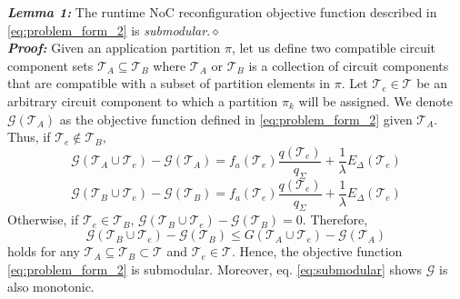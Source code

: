 {{\noindent\textbf{\textit{Lemma 1:}} The runtime NoC reconfiguration objective function described in \eqref{eq:problem_form_2} is \textit{submodular}.\hfill $\diamond$\\
\textbf{\textit{Proof:}} Given an application partition $\pi$, let us define two compatible circuit component sets $\mathcal T_A \subseteq \mathcal T_B$ where $\mathcal T_A$ or $\mathcal T_B$ is a collection of circuit components that are compatible with a subset of partition elements in $\pi$. Let $\mathcal T_{e} \in \mathcal T$ be an arbitrary circuit component to which a partition $\pi_{k}$ will be assigned. We denote $\mathcal G(\mathcal T_A)$ as the objective function defined in \eqref{eq:problem_form_2} given $\mathcal T_A$. Thus, if $\mathcal T_{e} \notin \mathcal T_{B}$,
\begin{equation}\label{eq:submodular}
\mathcal G(\mathcal T_A \cup \mathcal T_e)-\mathcal G(\mathcal T_A )= f_{a}(\mathcal T_{e})\frac{q(\mathcal T_{e})}{q_{\Sigma}}+ \frac{1}{\lambda} E_{\Delta}(\mathcal T_{e}) 
\end{equation}
\begin{equation}\label{eq:submodular_2}
\mathcal G(\mathcal T_B \cup \mathcal T_e)-\mathcal G(\mathcal T_B )= f_{a}(\mathcal T_{e})\frac{q(\mathcal T_{e})}{q_{\Sigma}}+ \frac{1}{\lambda} E_{\Delta}(\mathcal T_{e}) 
\end{equation}
Otherwise, if $\mathcal T_{e} \in \mathcal T_{B}$, $\mathcal G(\mathcal T_B \cup \mathcal T_e)-\mathcal G(\mathcal T_B )=0$. Therefore, 
\begin{equation}\label{eq:submodular_2}
\mathcal G(\mathcal T_B \cup \mathcal T_e)-\mathcal G(\mathcal T_B )\leq G(\mathcal T_A \cup \mathcal T_e)-\mathcal G(\mathcal T_A )   \end{equation}
holds for  any $\mathcal T_A \subseteq \mathcal T_B \subset \mathcal T$ and $\mathcal T_{e} \in \mathcal T$. Hence, the objective function \eqref{eq:problem_form_2} is submodular. Moreover, eq. \eqref{eq:submodular} shows $\mathcal G$ is also monotonic.

}}
